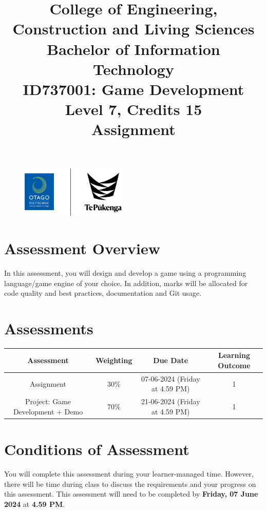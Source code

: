 \documentclass{article}
\author{}
\begin{document}
\begin{figure}
	\centering
	\includegraphics[width=50mm]{../../resources/img/logo.png}
\end{figure}

\title{College of Engineering, Construction and Living Sciences\\Bachelor of Information Technology\\ID737001: Game Development\\Level 7, Credits 15\\\textbf{Assignment}}
\date{}
\maketitle

\section*{Assessment Overview}
In this assessment, you will design and develop a game using a programming language/game engine of your choice. In addition, marks will be allocated for code quality and best practices, documentation and Git usage.

\section*{Assessments}
\renewcommand{\arraystretch}{1.5}
\begin{tabular}{|c|c|c|c|}
	\hline
	\textbf{Assessment}                                 & \textbf{Weighting} & \textbf{Due Date}            & \textbf{Learning Outcome} \\ \hline
	\small Assignment  & \small 30\%        & \small 07-06-2024 (Friday at 4.59 PM)   & \small 1                  \\ \hline
	\small Project: Game Development + Demo & \small 70\%        & \small 21-06-2024 (Friday at 4.59 PM)   & \small 1                   \\ \hline
\end{tabular} 

\section*{Conditions of Assessment}
You will complete this assessment during your learner-managed time. However, there will be time during class to discuss the requirements and your progress on this assessment. This assessment will need to be completed by \textbf{Friday, 07 June 2024} at \textbf{4.59 PM}. 
\end{document}
